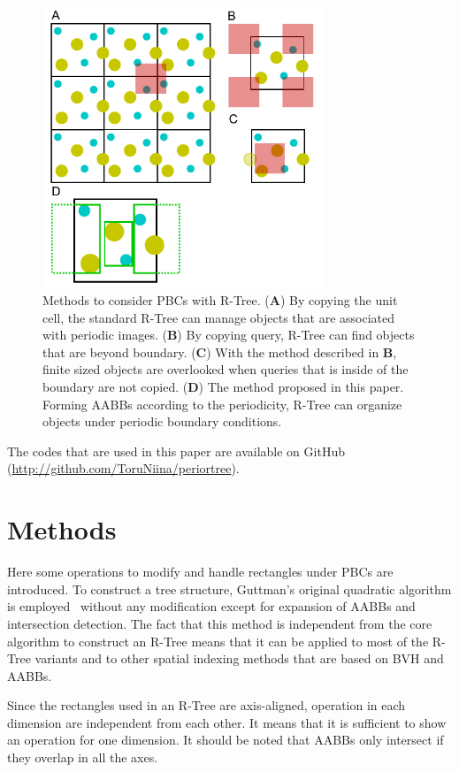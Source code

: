 \documentclass[10pt,letterpaper,twocolumn]{article}
\begin{document}
\begin{figure}[hbt]
    \includegraphics[width=8.4cm, bb=6 3 220 224]{fig1.eps}
    \caption{Methods to consider PBCs with R-Tree.
    (\textbf{A})
    By copying the unit cell, the standard R-Tree can manage objects that are
    associated with periodic images.
    (\textbf{B})
    By copying query, R-Tree can find objects that are beyond boundary.
    (\textbf{C})
    With the method described in \textbf{B}, finite sized objects are
    overlooked when queries that is inside of the boundary are not copied.
    (\textbf{D})
    The method proposed in this paper. Forming AABBs according to
    the periodicity, R-Tree can organize objects under periodic boundary
    conditions.}
    \label{fig-method-rtree-pbc}
\end{figure}

The codes that are used in this paper are available on GitHub
(\url{http://github.com/ToruNiina/periortree}).

\section*{Methods}

Here some operations to modify and handle rectangles under PBCs are introduced.
To construct a tree structure, Guttman's original quadratic algorithm is
employed~\cite{Guttman1984} without any modification except for expansion of
AABBs and intersection detection.
The fact that this method is independent from the core algorithm to construct
an R-Tree means that it can be applied to most of the R-Tree variants and to
other spatial indexing methods that are based on BVH and AABBs.

Since the rectangles used in an R-Tree are axis-aligned, operation in each
dimension are independent from each other.
It means that it is sufficient to show an operation for one dimension.
It should be noted that AABBs only intersect if they overlap in all the axes.
\end{document}
